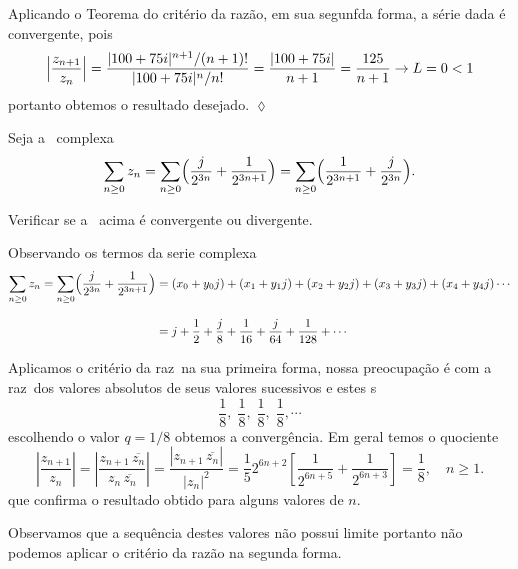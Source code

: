 \solo Aplicando o Teorema do critério da razão, em sua segunfda forma, a série dada é
convergente, pois
\begin{equation*}
  \Bigl|\frac{z_{n+1}}{z_{n}}\Bigr|=\frac{|100+75i|^{n+1}/(n+1)!}{|100+75i|^{n}/n!}=
  \frac{|100+75i|}{n+1}=\frac{125}{n+1}\to L=0<1
\end{equation*}
portanto obtemos o resultado desejado. \hfill \(\lozenge\)

\begin{exer}
Seja a \ser\ complexa
\begin{equation*}
\sum_{n\geq 0}z_n=\sum_{n\geq
0}\Bigl(\frac{j}{2^{3n}}+\frac{1}{2^{3n+1}}\Bigr)=
\sum_{n\geq 0}\Bigl(\frac{1}{2^{3n+1}}+\frac{j}{2^{3n}}\Bigr).
\end{equation*}

Verificar se a \ser\ acima \'e convergente ou divergente.
\end{exer}

\solo
Observando os termos da serie complexa
\begin{align*}
\sum_{n\geq 0}z_{n} =\sum_{n\geq
0}\Bigl(\frac{j}{2^{3n}}+\frac{1}{2^{3n+1}}\Bigr)&=
(x_{0}+y_{0}j)+(x_{1}+y_{1}j)+(x_{2}+y_{2}j)+(x_{3}+y_{3}j)+ (x_{4}+y_{4}j) \cdots\\[2ex]
& =j+\frac{1}{2}+\frac{j}{8}+\frac{1}{16} +\frac{j}{64}+\frac{1}{128}+\cdots
\end{align*}

Aplicamos o critério da raz\ao\, na sua primeira forma, nossa
preocupa\c{c}\~{a}o \'{e} com a raz\ao\ dos valores absolutos de seus valores
sucessivos e estes s\ao\
 \begin{equation*}
  \dfrac{1}{8}, \;  \frac{1}{8},\; \dfrac{1}{8},\;  \dfrac{1}{8},\cdots
 \end{equation*}
 escolhendo o valor $q=1/8$ obtemos a converg\^encia.  Em geral temos o quociente
 \begin{equation*}
  \left|\dfrac{z_{n+1}}{z_{n}}\right|=\left|\dfrac{z_{n+1}\,\overline{z_{n}}}{z_{n}\,\overline{z_{n}}}\right|
  =\dfrac{|z_{n+1}\,\overline{z_{n}}|}{|z_{n}|^{2}}=
  \dfrac{1}{5}2^{6n+2}\left[\dfrac{1}{2^{6n+5}}+\dfrac{1}{2^{6n+3}}\right]= \dfrac{1}{8}, \quad n \geq 1.
 \end{equation*}
 que confirma o resultado obtido para alguns valores de \(n\).

Observamos que a sequência destes valores não possui limite portanto não podemos aplicar
o critério da razão na segunda forma.

